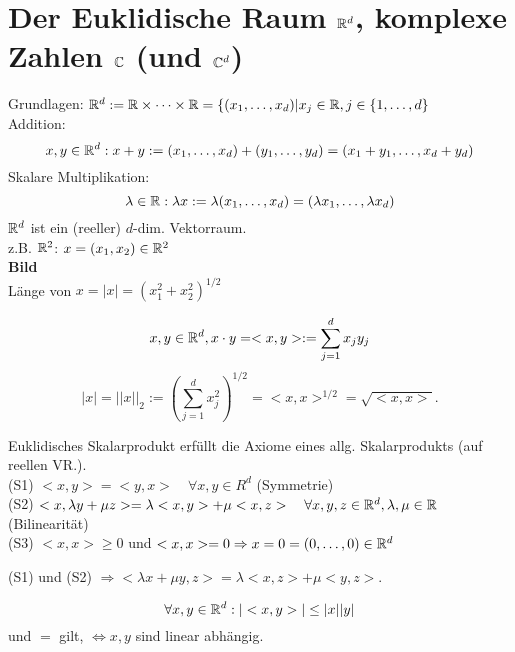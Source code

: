 \documentclass[../ana1.tex]{subfiles}
\begin{document}
\section{Der Euklidische Raum \( \mathbb{R}^d \), komplexe Zahlen \( \mathbb{C} \) (und \(\mathbb{C}^d \))}
Grundlagen: \( \mathbb{R}^d := \mathbb{R} \times \dots \times \mathbb{R} = \{ (x_1, \dots, x_d) | x_j \in\mathbb{R}, j\in\{1,\dots, d \} \)\\
Addition:
\[x, y \in \mathbb{R}^d: x + y := (x_1, \dots , x_d) + (y_1, \dots, y_d) = (x_1 + y_1, \dots, x_d + y_d) \]
Skalare Multiplikation:
\[\lambda \in \mathbb{R}: \lambda x := \lambda(x_1, \dots , x_d) = (\lambda x_1, \dots, \lambda x_d) \]
\( \mathbb{R}^d \) ist ein (reeller) \(d\)-dim. Vektorraum.\\
z.B. \(\mathbb{R}^2\): \(x = (x_1, x_2) \in \mathbb{R}^2\)\\
\textbf{Bild}\\%
Länge von \(x = |x| = (x_1^2 + x_2^2)^{1/2}\)
\begin{defi}
	\[ x,y \in\mathbb{R}^d, x\cdot y = <x,y> := \sum_{j=1}^{d}x_j y_j \]
	\[ |x| = ||x||_2 := (\sum_{j=1}^{d} x_j^2 )^{1/2} = <x,x>^{1/2} = \sqrt{<x,x>}. \]
\end{defi}
\begin{bem}
	Euklidisches Skalarprodukt erfüllt die Axiome eines allg. Skalarprodukts (auf reellen VR.).\\
	(S1) \( <x,y> = <y,x> \quad\forall x,y\in R^d \) (Symmetrie)\\
	(S2) \( <x, \lambda y + \mu z> = \lambda <x,y> + \mu<x,z> \quad \forall x,y,z\in\mathbb{R}^d, \lambda, \mu \in\mathbb{R} \) (Bilinearität)\\
	(S3) \( <x,x> \geq 0 \) und \( <x,x> = 0 \Rightarrow x=0 = (0,\dots,0) \in\mathbb{R}^d \)
\end{bem}
\begin{bem}
	(S1) und (S2) \( \Rightarrow <\lambda x + \mu y, z> = \lambda <x,z> + \mu <y,z> \).
\end{bem}
\begin{satz}
	\[ \forall x,y\in\mathbb{R}^d: |<x,y>|\leq |x||y|\]
	und \glqq\(=\)\grqq{} gilt, \( \Leftrightarrow x,y \) sind linear abhängig.
\end{satz}
\end{document}
